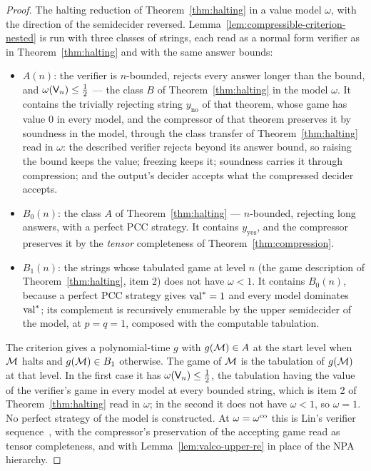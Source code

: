 \begin{proof}
\leanok
The halting reduction of Theorem~\ref{thm:halting} in a value model $\omega$, with the
direction of the semidecider reversed. Lemma~\ref{lem:compressible-criterion-nested} is run
with three classes of strings, each read as a normal form verifier as in
Theorem~\ref{thm:halting} and with the same answer bounds:
\begin{itemize}
\item $A(n)$: the verifier is $n$-bounded, rejects every answer longer than the bound, and
  $\omega(\mathsf{V}_n) \leq \frac12$ --- the class $B$ of Theorem~\ref{thm:halting} in the
  model $\omega$. It contains the trivially rejecting string $y_{\mathrm{no}}$ of that
  theorem, whose game has value $0$ in every model, and the compressor of that theorem
  preserves it by soundness in the model, through the class transfer of
  Theorem~\ref{thm:halting} read in $\omega$: the described verifier rejects beyond its
  answer bound, so raising the bound keeps the value; freezing keeps it; soundness carries it
  through compression; and the output's decider accepts what the compressed decider accepts.
\item $B_0(n)$: the class $A$ of Theorem~\ref{thm:halting} --- $n$-bounded, rejecting long
  answers, with a perfect PCC strategy. It contains $y_{\mathrm{yes}}$, and the compressor
  preserves it by the \emph{tensor} completeness of Theorem~\ref{thm:compression}.
\item $B_1(n)$: the strings whose tabulated game at level $n$ (the game description of
  Theorem~\ref{thm:halting}, item 2) does not have $\omega < 1$. It contains $B_0(n)$,
  because a perfect PCC strategy gives $\mathrm{val}^* = 1$ and every model dominates $\mathrm{val}^*$;
  its complement is recursively enumerable by the upper semidecider of the model, at
  $p = q = 1$, composed with the computable tabulation.
\end{itemize}
The criterion gives a polynomial-time $g$ with $g(\mathcal{M}) \in A$ at the start level when
$\mathcal{M}$ halts and $g(\mathcal{M}) \in B_1$ otherwise. The game of $\mathcal{M}$ is the
tabulation of $g(\mathcal{M})$ at that level. In the first case it has
$\omega(\mathsf{V}_n) \leq \frac12$, the tabulation having the value of the verifier's game in
every model at every bounded string, which is item 2 of Theorem~\ref{thm:halting} read in
$\omega$; in the second it does not have $\omega < 1$, so $\omega = 1$. No perfect strategy
of the model is constructed. At $\omega = \omega^{\mathrm{co}}$ this is Lin's verifier
sequence~\cite{Lin25}, with the compressor's preservation of the accepting game read as
tensor completeness, and with Lemma~\ref{lem:valco-upper-re} in place of the NPA hierarchy.
\end{proof}

